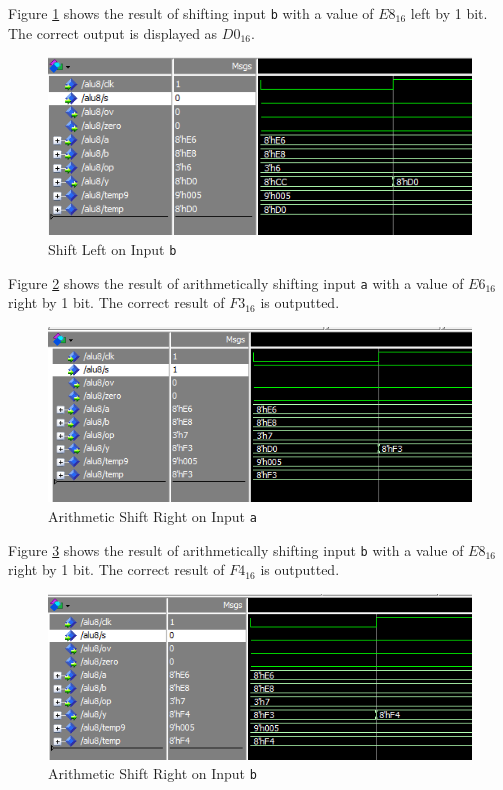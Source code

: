 \documentclass[12pt]{article}
\begin{document}
Figure \ref{fig:sll-b} shows the result of shifting input \texttt{b} with a value of $E8_{16}$ left by 1 bit. The correct output is displayed as $D0_{16}$.

\begin{figure}[H]
\centering
\includegraphics[width=1\linewidth]{sll-b}
\caption{Shift Left on Input \texttt{b}}
\label{fig:sll-b}
\end{figure}

Figure \ref{fig:sra-a} shows the result of arithmetically shifting input \texttt{a} with a value of $E6_{16}$ right by 1 bit. The correct result of $F3_{16}$ is outputted.
\begin{figure}[H]
\centering
\includegraphics[width=1\linewidth]{sra-a}
\caption{Arithmetic Shift Right on Input \texttt{a}}
\label{fig:sra-a}
\end{figure}


Figure \ref{fig:sra-b} shows the result of arithmetically shifting input \texttt{b} with a value of $E8_{16}$ right by 1 bit. The correct result of $F4_{16}$ is outputted.

\begin{figure}[H]
\centering
\includegraphics[width=1\linewidth]{sra-b}
\caption{Arithmetic Shift Right on Input \texttt{b}}
\label{fig:sra-b}
\end{figure}
\end{document}

